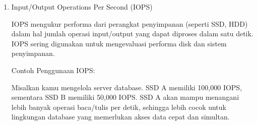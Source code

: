 \documentclass[12pt]{article}
\begin{document}
\begin{enumerate}
    \item Input/Output Operations Per Second (IOPS)
    \par IOPS mengukur performa dari perangkat penyimpanan (seperti SSD, HDD) dalam hal jumlah operasi input/output yang dapat diproses dalam satu detik. IOPS sering digunakan untuk mengevaluasi performa disk dan sistem penyimpanan.
    \par Contoh Penggunaan IOPS:
    \par Misalkan kamu mengelola server database. SSD A memiliki 100,000 IOPS, sementara SSD B memiliki 50,000 IOPS. SSD A akan mampu menangani lebih banyak operasi baca/tulis per detik, sehingga lebih cocok untuk lingkungan database yang memerlukan akses data cepat dan simultan.
    
\end{enumerate}
\end{document}
